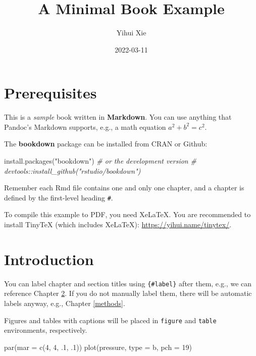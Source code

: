 \documentclass[
]{book}
\title{A Minimal Book Example}
\author{Yihui Xie}
\date{2022-03-11}
\newenvironment{Shaded}{\begin{snugshade}}{\end{snugshade}}
\newcommand{\AttributeTok}[1]{\textcolor[rgb]{0.77,0.63,0.00}{#1}}
\newcommand{\CommentTok}[1]{\textcolor[rgb]{0.56,0.35,0.01}{\textit{#1}}}
\newcommand{\DecValTok}[1]{\textcolor[rgb]{0.00,0.00,0.81}{#1}}
\newcommand{\FunctionTok}[1]{\textcolor[rgb]{0.00,0.00,0.00}{#1}}
\newcommand{\NormalTok}[1]{#1}
\newcommand{\StringTok}[1]{\textcolor[rgb]{0.31,0.60,0.02}{#1}}
\begin{document}
\maketitle

{
\setcounter{tocdepth}{1}
\tableofcontents
}
\hypertarget{prerequisites}{%
\chapter{Prerequisites}\label{prerequisites}}

This is a \emph{sample} book written in \textbf{Markdown}. You can use anything that Pandoc's Markdown supports, e.g., a math equation \(a^2 + b^2 = c^2\).

The \textbf{bookdown} package can be installed from CRAN or Github:

\begin{Shaded}
\begin{Highlighting}[]
\FunctionTok{install.packages}\NormalTok{(}\StringTok{"bookdown"}\NormalTok{)}
\CommentTok{\# or the development version}
\CommentTok{\# devtools::install\_github("rstudio/bookdown")}
\end{Highlighting}
\end{Shaded}

Remember each Rmd file contains one and only one chapter, and a chapter is defined by the first-level heading \texttt{\#}.

To compile this example to PDF, you need XeLaTeX. You are recommended to install TinyTeX (which includes XeLaTeX): \url{https://yihui.name/tinytex/}.

\hypertarget{intro}{%
\chapter{Introduction}\label{intro}}

You can label chapter and section titles using \texttt{\{\#label\}} after them, e.g., we can reference Chapter \ref{intro}. If you do not manually label them, there will be automatic labels anyway, e.g., Chapter \ref{methods}.

Figures and tables with captions will be placed in \texttt{figure} and \texttt{table} environments, respectively.

\begin{Shaded}
\begin{Highlighting}[]
\FunctionTok{par}\NormalTok{(}\AttributeTok{mar =} \FunctionTok{c}\NormalTok{(}\DecValTok{4}\NormalTok{, }\DecValTok{4}\NormalTok{, .}\DecValTok{1}\NormalTok{, .}\DecValTok{1}\NormalTok{))}
\FunctionTok{plot}\NormalTok{(pressure, }\AttributeTok{type =} \StringTok{\textquotesingle{}b\textquotesingle{}}\NormalTok{, }\AttributeTok{pch =} \DecValTok{19}\NormalTok{)}
\end{Highlighting}
\end{Shaded}
\end{document}
